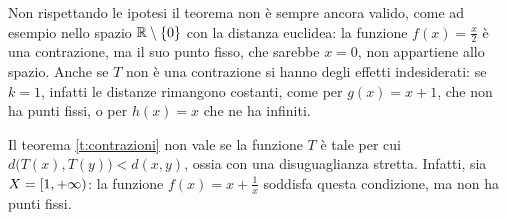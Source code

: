 Non rispettando le ipotesi il teorema non è sempre ancora valido, come ad esempio nello spazio $\mathbb{R}\setminus\{0\}$ con la distanza euclidea: la funzione $f(x)=\frac{x}2$ è una contrazione, ma il suo punto fisso, che sarebbe $x=0$, non appartiene allo spazio.
Anche se $T$ non è una contrazione si hanno degli effetti indesiderati: se $k=1$, infatti le distanze rimangono costanti, come per $g(x)=x+1$, che non ha punti fissi, o per $h(x)=x$ che ne ha infiniti.
\begin{osservazione}
Il teorema \ref{t:contrazioni} non vale se la funzione $T$ è tale per cui $d\big(T(x),T(y)\big)<d(x,y)$, ossia con una disuguaglianza stretta. Infatti, sia $X=[1,+\infty)$: la funzione $f(x)=x+\frac1{x}$ soddisfa questa condizione, ma non ha punti fissi.
\end{osservazione}
